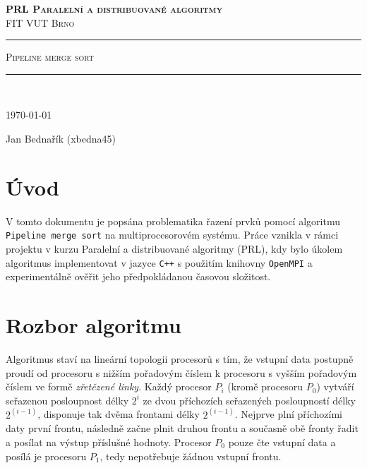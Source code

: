 \documentclass[12pt,a4paper,titlepage,final]{article}
\begin{document}
\setcounter{page}{1}

    
\begin{centering}
\textsc{\textbf{PRL Paralelní a distribuované algoritmy} \\
FIT VUT Brno\\
}

\rule{\textwidth}{1.6pt}\vspace*{-\baselineskip}\vspace*{25pt} 

\begin{LARGE}
\textsc{Pipeline merge sort}
\end{LARGE}

\rule{\textwidth}{1.6pt}\\ %

\vspace*{5pt} 
\begin{footnotesize}
\today
\end{footnotesize}
\vspace*{5pt} 

\begin{large}
Jan Bednařík (xbedna45)\\
\end{large}

\end{centering}


\section{Úvod}
V tomto dokumentu je popsána problematika řazení prvků pomocí algoritmu \texttt{Pipeline merge sort} na multiprocesorovém systému. Práce vznikla v rámci projektu v kurzu Paralelní a distribuované algoritmy (PRL), kdy bylo úkolem algoritmus implementovat v jazyce \texttt{C++} s použitím knihovny \texttt{OpenMPI} a experimentálně ověřit jeho předpokládanou časovou složitost.

\section{Rozbor algoritmu}
Algoritmus staví na lineární topologii procesorů s tím, že vstupní data postupně proudí od procesoru s nižším pořadovým číslem k procesoru s vyšším pořadovým číslem ve formě \textit{zřetězené linky}. Každý procesor $P_i$ (kromě procesoru $P_0$) vytváří seřazenou posloupnost délky $2^i$ ze dvou příchozích seřazených posloupností délky $2^{(i-1)}$, disponuje tak dvěma frontami délky $2^{(i-1)}$. Nejprve plní příchozími daty první frontu, následně začne plnit druhou frontu a současně obě fronty řadit a posílat na výstup příslušné hodnoty. Procesor $P_0$ pouze čte vstupní data a posílá je procesoru $P_1$, tedy nepotřebuje žádnou vstupní frontu.
\end{document}
